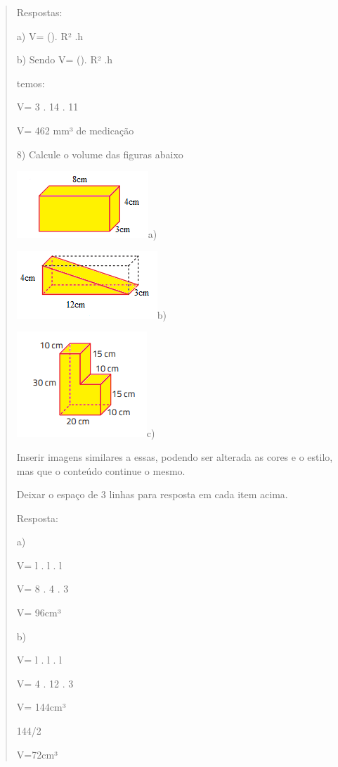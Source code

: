 \begin{quote}
\begin{escolha}
Respostas:

a) V= (\Pi). R² .h

b) Sendo V= (\Pi). R² .h

temos:

V= 3 . 14 . 11

V= 462 mm³ de medicação

8) Calcule o volume das figuras abaixo

\includegraphics[width=1.94792in,height=0.98958in]{./imgSAEB_8_MAT/media/image51.png}a)

\includegraphics[width=2.08333in,height=1in]{./imgSAEB_8_MAT/media/image52.png}b)

\includegraphics[width=1.92708in,height=1.5625in]{./imgSAEB_8_MAT/media/image53.png}c)

Inserir imagens similares a essas, podendo ser alterada as cores e o
estilo, mas que o conteúdo continue o mesmo.

Deixar o espaço de 3 linhas para resposta em cada item acima.

Resposta:

a)

V= l . l . l

V= 8 . 4 . 3

V= 96cm³

b)

V= l . l . l

V= 4 . 12 . 3

V= 144cm³

144/2

V=72cm³


\end{escolha}
\end{quote}
